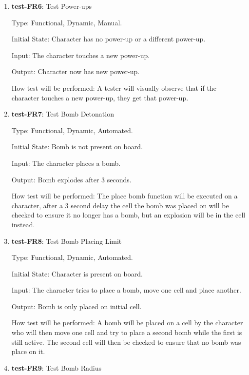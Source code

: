 \documentclass[12pt, titlepage]{article}
\begin{document}
\begin{enumerate}

\item{\textbf{test-FR6}: Test Power-ups\\}

Type: Functional, Dynamic, Manual.
					
Initial State: Character has no power-up or a different power-up.
					
Input: The character touches a new power-up.
					
Output: Character now has new power-up.
					
How test will be performed: A tester will visually observe that if the character touches a new power-up, they get that power-up.

\item{\textbf{test-FR7}: Test Bomb Detonation\\} 

Type: Functional, Dynamic, Automated.
					
Initial State: Bomb is not present on board.
					
Input: The character places a bomb.
					
Output: Bomb explodes after 3 seconds.
					
How test will be performed: The place bomb function will be executed on a character, after a 3 second delay the cell the bomb was placed on will be checked to ensure it no longer has a bomb, but an explosion will be in the cell instead.

\item{\textbf{test-FR8}: Test Bomb Placing Limit\\}

Type: Functional, Dynamic, Automated.
					
Initial State: Character is present on board.
					
Input: The character tries to place a bomb, move one cell and place another.
					
Output: Bomb is only placed on initial cell.
					
How test will be performed: A bomb will be placed on a cell by the character who will then move one cell and try to place a second bomb while the first is still active. The second cell will then be checked to ensure that no bomb was place on it.

\item{\textbf{test-FR9}: Test Bomb Radius\\} 


\end{enumerate}
\end{document}
